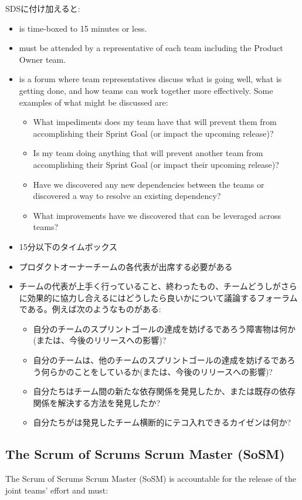 \documentclass[12pt,a4paper,parskip=full]{scrartcl}
\begin{document}
SDSに付け加えると:
\begin{itemize}
\item is time-boxed to 15 minutes or less.
\item must be attended by a representative of each team including the Product Owner team.
\item is a forum where team representatives discuss what is going well, what is getting done, and how teams can work together more effectively. Some examples of what might be discussed are:
\begin{itemize}
\item What impediments does my team have that will prevent them from
accomplishing their Sprint Goal (or impact the upcoming release)?
\item Is my team doing anything that will prevent another team from
accomplishing their Sprint Goal (or impact their upcoming release)?
\item Have we discovered any new dependencies between the teams or
discovered a way to resolve an existing dependency?
\item What improvements have we discovered that can be leveraged across teams?
\end{itemize}
\end{itemize}
\fi
\begin{itemize}
\item 15分以下のタイムボックス
\item プロダクトオーナーチームの各代表が出席する必要がある
\item チームの代表が上手く行っていること、終わったもの、チームどうしがさらに効果的に協力し合えるにはどうしたら良いかについて議論するフォーラムである。例えば次のようなものがある:
\begin{itemize}
\item 自分のチームのスプリントゴールの達成を妨げるであろう障害物は何か(または、今後のリリースへの影響)?
\item 自分のチームは、他のチームのスプリントゴールの達成を妨げるであろう何らかのことをしているか(または、今後のリリースへの影響)?
\item 自分たちはチーム間の新たな依存関係を発見したか、または既存の依存関係を解決する方法を発見したか?
\item 自分たちがは発見したチーム横断的にテコ入れできるカイゼンは何か?
\end{itemize}
\end{itemize}

\subsection{The Scrum of Scrums Scrum Master (SoSM)}
The Scrum of Scrums Scrum Master (SoSM) is accountable for the release of the
joint teams' effort and must:
\fi
\end{document}
